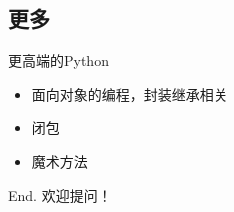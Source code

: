 \documentclass[xcolor=dvipsnames, 9pt]{beamer}
\begin{document}
\subsection{更多}
\begin{frame}{更高端的Python}
	\begin{itemize}
		\item<2-> 面向对象的编程，封装继承相关
			\vspace{0.1cm}
		\item<3-> 闭包
			\vspace{0.1cm}
		\item<4-> 魔术方法
	\end{itemize}
\end{frame}

\begin{frame}{End.}
	\huge{欢迎提问！}
\end{frame}
\end{document}
